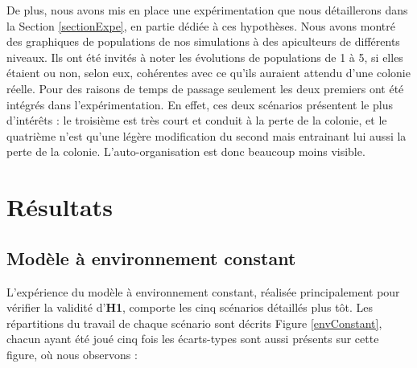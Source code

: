 			De plus, nous avons mis en place une expérimentation que nous détaillerons dans la Section \ref{sectionExpe}, en partie dédiée à ces hypothèses. Nous avons montré des graphiques de populations de nos simulations à des apiculteurs de différents niveaux. Ils ont été invités à noter les évolutions de populations de 1 à 5, si elles étaient ou non, selon eux, cohérentes avec ce qu'ils auraient attendu d'une colonie réelle. Pour des raisons de temps de passage seulement les deux premiers ont été intégrés dans l'expérimentation. En effet, ces deux scénarios présentent le plus d'intérêts : le troisième est très court et conduit à la perte de la colonie, et le quatrième n'est qu'une légère modification du second mais entrainant lui aussi la perte de la colonie. L'auto-organisation est donc beaucoup moins visible.
				
			
	\section{Résultats}
	
	\subsection{Modèle à environnement constant}
	
	L'expérience du modèle à environnement constant, réalisée principalement pour vérifier la validité d'\textbf{H1}, comporte les cinq scénarios détaillés plus tôt. Les répartitions du travail de chaque scénario sont décrits Figure \ref{envConstant}, chacun ayant été joué cinq fois les écarts-types sont aussi présents sur cette figure, où nous observons :
	
